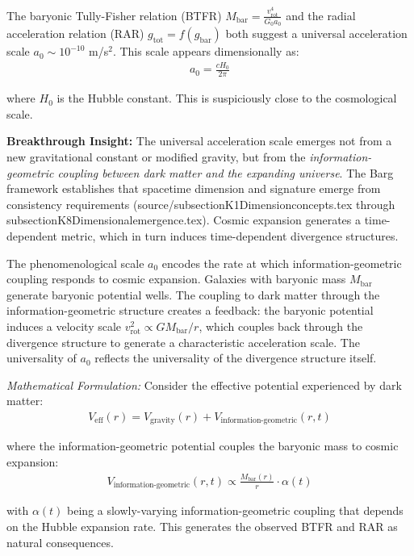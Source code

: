 \documentclass[12pt,a4paper]{article}
\begin{document}
The baryonic Tully-Fisher relation (BTFR) $M_{\text{bar}} = \frac{v_{\text{rot}}^4}{G_0 a_0}$ and the radial acceleration relation (RAR) $g_{\text{tot}} = f(g_{\text{bar}})$ both suggest a universal acceleration scale $a_0 \sim 10^{-10}$ m/s$^2$. This scale appears dimensionally as:
\begin{align}
a_0 = \frac{c H_0}{2\pi}
\end{align}

where $H_0$ is the Hubble constant. This is suspiciously close to the cosmological scale.

\textbf{Breakthrough Insight:} The universal acceleration scale emerges not from a new gravitational constant or modified gravity, but from the \textit{information-geometric coupling between dark matter and the expanding universe}. The Barg framework establishes that spacetime dimension and signature emerge from consistency requirements (source/subsectionK1Dimensionconcepts.tex through subsectionK8Dimensionalemergence.tex). Cosmic expansion generates a time-dependent metric, which in turn induces time-dependent divergence structures.

The phenomenological scale $a_0$ encodes the rate at which information-geometric coupling responds to cosmic expansion. Galaxies with baryonic mass $M_{\text{bar}}$ generate baryonic potential wells. The coupling to dark matter through the information-geometric structure creates a feedback: the baryonic potential induces a velocity scale $v_{\text{rot}}^2 \propto GM_{\text{bar}}/r$, which couples back through the divergence structure to generate a characteristic acceleration scale. The universality of $a_0$ reflects the universality of the divergence structure itself.

\textit{Mathematical Formulation:} Consider the effective potential experienced by dark matter:
\begin{align}
V_{\text{eff}}(r) = V_{\text{gravity}}(r) + V_{\text{information-geometric}}(r, t)
\end{align}

where the information-geometric potential couples the baryonic mass to cosmic expansion:
\begin{align}
V_{\text{information-geometric}}(r, t) \propto \frac{M_{\text{bar}}(r)}{r} \cdot \alpha(t)
\end{align}

with $\alpha(t)$ being a slowly-varying information-geometric coupling that depends on the Hubble expansion rate. This generates the observed BTFR and RAR as natural consequences.
\end{document}
